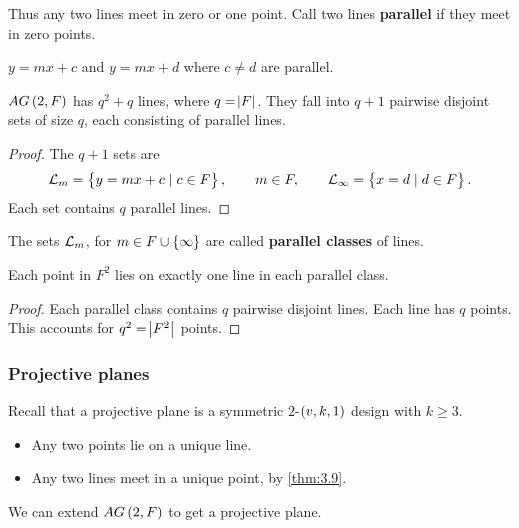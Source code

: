 Thus any two lines meet in zero or one point. Call two lines \textbf{parallel} if they meet in zero points.

\begin{example*}
$ y = mx + c $ and $ y = mx + d $ where $ c \ne d $ are parallel.
\end{example*}

\begin{proposition}
$ AG\br{2, F} $ has $ q^2 + q $ lines, where $ q = \abs{F} $. They fall into $ q + 1 $ pairwise disjoint sets of size $ q $, each consisting of parallel lines.
\end{proposition}

\begin{proof}
The $ q + 1 $ sets are
$$ \LL_m = \cbr{y = mx + c \mid c \in F}, \qquad m \in F, \qquad \LL_\infty = \cbr{x = d \mid d \in F}. $$
Each set contains $ q $ parallel lines.
\end{proof}

\begin{definition*}
The sets $ \mathcal{L}_m $, for $ m \in F \cup \cbr{\infty} $ are called \textbf{parallel classes} of lines.
\end{definition*}

\begin{proposition}
\label{prop:3.14}
Each point in $ F^2 $ lies on exactly one line in each parallel class.
\end{proposition}

\begin{proof}
Each parallel class contains $ q $ pairwise disjoint lines. Each line has $ q $ points. This accounts for $ q^2 = \abs{F^2} $ points.
\end{proof}

\subsubsection{Projective planes}

Recall that a projective plane is a symmetric $ 2 $-$ \br{v, k, 1} $ design with $ k \ge 3 $.
\begin{itemize}
\item Any two points lie on a unique line.
\item Any two lines meet in a unique point, by \ref{thm:3.9}.
\end{itemize}
We can extend $ AG\br{2, F} $ to get a projective plane.

\pagebreak

